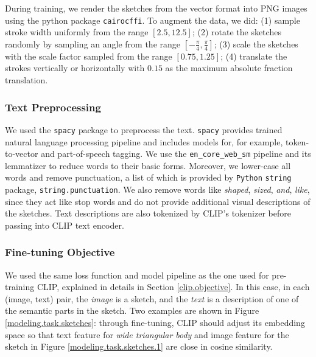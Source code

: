 During training, we render the sketches from the vector format into PNG images using the python package \texttt{cairocffi}. To augment the data, we did: (1) sample stroke width uniformly from the range $[2.5,12.5]$; (2) rotate the sketches randomly by sampling an angle from the range $[-\frac{\pi}{4}, \frac{\pi}{4}]$; (3) scale the sketches with the scale factor sampled from the range $[0.75, 1.25]$; (4) translate the strokes vertically or horizontally with $0.15$ as the maximum absolute fraction translation.   

\subsubsection*{Text Preprocessing} \label{text.preprocess}
We used the \texttt{spacy} package to preprocess the text. \texttt{spacy} provides trained natural language processing pipeline and includes models for, for example, token-to-vector and part-of-speech tagging. We use the \texttt{en\_core\_web\_sm} pipeline and its lemmatizer to reduce words to their basic forms. Moreover, we lower-case all words and remove punctuation, a list of which is provided by \texttt{Python} \texttt{string} package, \texttt{string.punctuation}. We also remove words like \textit{shaped}, \textit{sized}, \textit{and}, \textit{like}, since they act like stop words and do not provide additional visual descriptions of the sketches. Text descriptions are also tokenized by CLIP's tokenizer before passing into CLIP text encoder.     

\subsubsection*{Fine-tuning Objective} \label{finetune.objective}
We used the same loss function and model pipeline as the one used for pre-training CLIP, explained in details in Section \ref{clip.objective}. In this case, in each (image, text) pair, the \textit{image} is a sketch, and the \textit{text} is a description of one of the semantic parts in the sketch. Two examples are shown in Figure \ref{modeling.task.sketches}: through fine-tuning, CLIP should adjust its embedding space so that text feature for \textit{wide triangular body} and image feature for the sketch in Figure \ref{modeling.task.sketches.1} are close in cosine similarity.  

